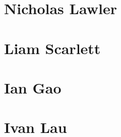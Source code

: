 \documentclass[11pt,a4paper]{report}
\begin{document}
\chapter{Nicholas Lawler}


\chapter{Liam Scarlett}


\chapter{Ian Gao}


\chapter{Ivan Lau}

\end{document}
